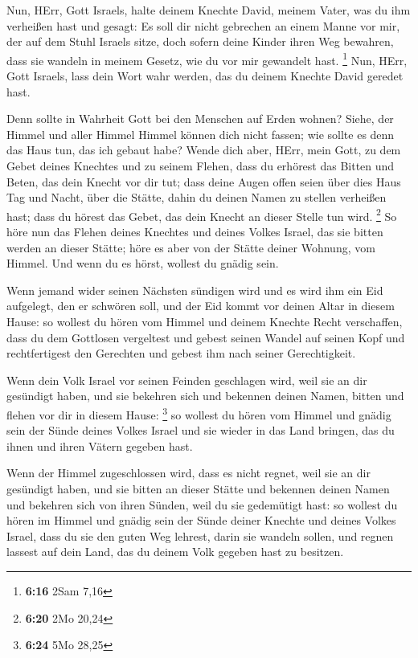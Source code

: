  Nun, HErr, Gott Israels, halte deinem Knechte David,
meinem Vater, was du ihm verheißen hast und gesagt: Es soll dir nicht
gebrechen an einem Manne vor mir, der auf dem Stuhl Israels sitze, doch
sofern deine Kinder ihren Weg bewahren, dass sie wandeln in meinem
Gesetz, wie du vor mir gewandelt hast. \footnote{\textbf{6:16} 2Sam 7,16}
 Nun, HErr, Gott Israels, lass dein Wort wahr werden, das
du deinem Knechte David geredet hast.

 Denn sollte in Wahrheit Gott bei den Menschen auf Erden
wohnen? Siehe, der Himmel und aller Himmel Himmel können dich nicht
fassen; wie sollte es denn das Haus tun, das ich gebaut habe?
 Wende dich aber, HErr, mein Gott, zu dem Gebet deines
Knechtes und zu seinem Flehen, dass du erhörest das Bitten und Beten,
das dein Knecht vor dir tut;  dass deine Augen offen seien
über dies Haus Tag und Nacht, über die Stätte, dahin du deinen Namen zu
stellen verheißen hast; dass du hörest das Gebet, das dein Knecht an
dieser Stelle tun wird. \footnote{\textbf{6:20} 2Mo 20,24} 
So höre nun das Flehen deines Knechtes und deines Volkes Israel, das sie
bitten werden an dieser Stätte; höre es aber von der Stätte deiner
Wohnung, vom Himmel. Und wenn du es hörst, wollest du gnädig sein.

 Wenn jemand wider seinen Nächsten sündigen wird und es
wird ihm ein Eid aufgelegt, den er schwören soll, und der Eid kommt vor
deinen Altar in diesem Hause:  so wollest du hören vom
Himmel und deinem Knechte Recht verschaffen, dass du dem Gottlosen
vergeltest und gebest seinen Wandel auf seinen Kopf und rechtfertigest
den Gerechten und gebest ihm nach seiner Gerechtigkeit.

 Wenn dein Volk Israel vor seinen Feinden geschlagen wird,
weil sie an dir gesündigt haben, und sie bekehren sich und bekennen
deinen Namen, bitten und flehen vor dir in diesem Hause: \footnote{\textbf{6:24}
  5Mo 28,25}  so wollest du hören vom Himmel und gnädig
sein der Sünde deines Volkes Israel und sie wieder in das Land bringen,
das du ihnen und ihren Vätern gegeben hast.

 Wenn der Himmel zugeschlossen wird, dass es nicht regnet,
weil sie an dir gesündigt haben, und sie bitten an dieser Stätte und
bekennen deinen Namen und bekehren sich von ihren Sünden, weil du sie
gedemütigt hast:  so wollest du hören im Himmel und gnädig
sein der Sünde deiner Knechte und deines Volkes Israel, dass du sie den
guten Weg lehrest, darin sie wandeln sollen, und regnen lassest auf dein
Land, das du deinem Volk gegeben hast zu besitzen.

